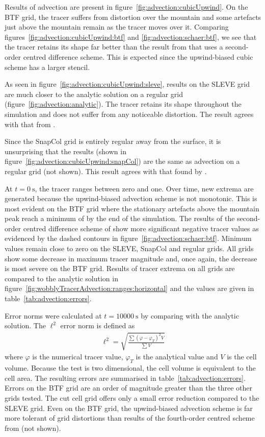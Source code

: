 Results of advection are present in figure~\ref{fig:advection:cubicUpwind}.
On the BTF grid, the tracer suffers from distortion over the mountain and some artefacts just above the mountain remain as the tracer moves over it.  Comparing figures~\ref{fig:advection:cubicUpwind:btf} and \ref{fig:advection:schaer:btf}, we see that the tracer retains its shape far better than the result from \textcite{schaer2002} that uses a second-order centred difference scheme.  This is expected since the upwind-biased cubic scheme has a larger stencil.

As seen in figure~\ref{fig:advection:cubicUpwind:sleve}, results on the SLEVE grid are much closer to the analytic solution on a regular grid (figure~\ref{fig:advection:analytic}).  The tracer retains its shape throughout the simulation and does not suffer from any noticeable distortion.  The result agrees with that from \textcite{schaer2002}.

Since the SnapCol grid is entirely regular away from the surface, it is unsurprising that the results (shown in figure~\ref{fig:advection:cubicUpwind:snapCol}) are the same as advection on a regular grid (not shown).  This result agrees with that found by \textcite{good2013}.

At $t = \SI{0}{\second}$, the tracer ranges between zero and one.  Over time, new extrema are generated because the upwind-biased advection scheme is not monotonic.  This is most evident on the BTF grid where the stationary artefacts above the mountain peak reach a minimum of  by the end of the simulation.  The results of the second-order centred difference scheme of \textcite{schaer2002} show more significant negative tracer values as evidenced by the dashed contours in figure~\ref{fig:advection:schaer:btf}.  Minimum values remain close to zero on the SLEVE, SnapCol and regular grids.  All grids show some decrease in maximum tracer magnitude and, once again, the decrease is most severe on the BTF grid.  Results of tracer extrema on all grids are compared to the analytic solution in figure~\ref{fig:wobblyTracerAdvection:ranges:horizontal} and the values are given in table~\ref{tab:advection:errors}.

Error norms were calculated at $t = \SI{10000}{\second}$ by comparing with the analytic solution.  The $\ell^2$ error norm is defined as
\begin{align}
\ell^2 = \sqrt{\frac{\sum \left( \varphi - \varphi_T \right)^2 V}{\sum V}}
\end{align}
where $\varphi$ is the numerical tracer value, $\varphi_T$ is the analytical value and $V$ is the cell volume.  Because the test is two dimensional, the cell volume is equivalent to the cell area.  The resulting errors are summarised in table~\ref{tab:advection:errors}.  Errors on the BTF grid are an order of magnitude greater than the three other grids tested.  The cut cell grid offers only a small error reduction compared to the SLEVE grid.  Even on the BTF grid, the upwind-biased advection scheme is far more tolerant of grid distortions than results of the fourth-order centred scheme from \textcite{schaer2002} (not shown).


